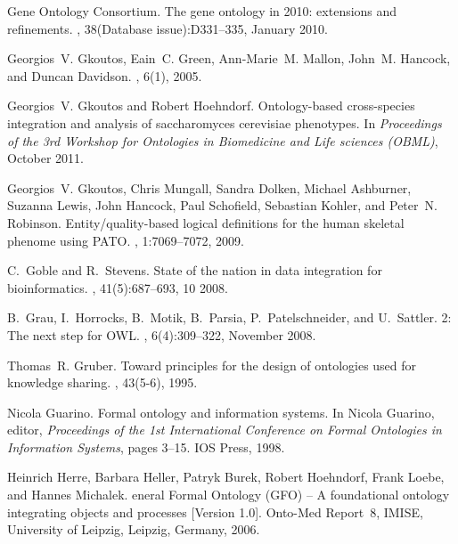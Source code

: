 \documentclass{bioinfo}
\begin{document}
\begin{thebibliography}{10}
{Gene Ontology Consortium}.
\newblock The gene ontology in 2010: extensions and refinements.
, 38(Database issue):D331--335, January
  2010.

Georgios~V. Gkoutos, Eain~C. Green, Ann-Marie~M. Mallon, John~M. Hancock, and
  Duncan Davidson.
, 6(1), 2005.

Georgios~V. Gkoutos and Robert Hoehndorf.
\newblock Ontology-based cross-species integration and analysis of
  saccharomyces cerevisiae phenotypes.
\newblock In {\em Proceedings of the 3rd Workshop for Ontologies in Biomedicine
  and Life sciences (OBML)}, October 2011.

Georgios~V. Gkoutos, Chris Mungall, Sandra Dolken, Michael Ashburner, Suzanna
  Lewis, John Hancock, Paul Schofield, Sebastian Kohler, and Peter~N. Robinson.
\newblock Entity/quality-based logical definitions for the human skeletal
  phenome using {PATO}.
, 1:7069--7072, 2009.

C.~Goble and R.~Stevens.
\newblock State of the nation in data integration for bioinformatics.
, 41(5):687--693, 10 2008.

B.~Grau, I.~Horrocks, B.~Motik, B.~Parsia, P.~Patelschneider, and U.~Sattler.
 2: The next step for {OWL}.
, 6(4):309--322, November 2008.

Thomas~R. Gruber.
\newblock Toward principles for the design of ontologies used for knowledge
  sharing.
, 43(5-6), 1995.

Nicola Guarino.
\newblock Formal ontology and information systems.
\newblock In Nicola Guarino, editor, {\em Proceedings of the 1st International
  Conference on Formal Ontologies in Information Systems}, pages 3--15. IOS
  Press, 1998.

Heinrich Herre, Barbara Heller, Patryk Burek, Robert Hoehndorf, Frank Loebe,
  and Hannes Michalek.
eneral {F}ormal {O}ntology ({GFO}) -- {A} foundational ontology
  integrating objects and processes [{V}ersion 1.0].
\newblock Onto-Med Report~8, IMISE, University of Leipzig, Leipzig, Germany,
  2006.


\end{thebibliography}
\end{document}
